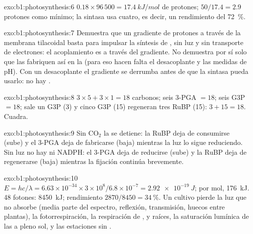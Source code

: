 \begin{solution}{exo:b1:photosynthesis:6}
$0.18\times 96\,500 = \qty{17.4}{kJ/mol}$ de protones; $50/17.4 = 2.9$
protones como mínimo; la sintasa usa cuatro, es decir, un rendimiento del
\qty{72}{\%}.
\end{solution}

\begin{solution}{exo:b1:photosynthesis:7}
Demuestra que un gradiente de protones a través de la membrana tilacoidal
basta para impulsar la síntesis de , sin luz y sin transporte de
electrones: el acoplamiento es a través del gradiente. No demuestra por sí
solo que las  fabriquen  así en la  (para eso
hacen falta el desacoplante y las medidas de pH). Con un desacoplante el
gradiente se derrumba antes de que la sintasa pueda usarlo: no hay .
\end{solution}

\begin{solution}{exo:b1:photosynthesis:8}
$3\times 5 + 3\times 1 = 18$ carbonos; seis 3-PGA $= 18$; seis G3P $= 18$;
sale un G3P (3) y cinco G3P (15) regeneran tres RuBP (15): $3 +
15 = 18$.
Cuadra.
\end{solution}

\begin{solution}{exo:b1:photosynthesis:9}
Sin $\mathrm{CO_2}$ la  se detiene: la RuBP deja de consumirse (sube)
y el 3-PGA deja de fabricarse (baja) mientras la luz lo sigue reduciendo.
Sin luz no hay  ni NADPH: el 3-PGA deja de reducirse (sube) y la RuBP
deja de regenerarse (baja) mientras la fijación continúa brevemente.
\end{solution}

\begin{solution}{exo:b1:photosynthesis:10}
$E = hc/\lambda = 6.63\times 10^{-34}\times 3\times 10^8/6.8\times
10^{-7} = \qty{2.92e-19}{J}$; por mol, \qty{176}{kJ}. 48 fotones:
\qty{8450}{kJ}; rendimiento $2870/8450 = \qty{34}{\%}$. Un cultivo pierde la
luz que no absorbe (media parte del espectro, reflexión, transmisión, huecos
entre plantas), la fotorrespiración, la respiración de ,  y
raíces, la saturación lumínica de las  a pleno sol, y las estaciones
sin .
\end{solution}

